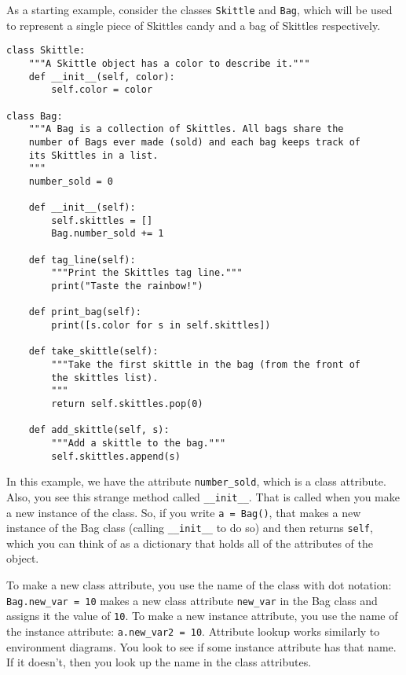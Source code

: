 As a starting example, consider the classes {\tt Skittle} and {\tt Bag}, which
will be used to represent a single piece of Skittles candy and a bag of Skittles
respectively.

\begin{lstlisting}
class Skittle:
    """A Skittle object has a color to describe it."""
    def __init__(self, color):
        self.color = color

class Bag:
    """A Bag is a collection of Skittles. All bags share the
    number of Bags ever made (sold) and each bag keeps track of
    its Skittles in a list.
    """
    number_sold = 0

    def __init__(self):
        self.skittles = []
        Bag.number_sold += 1

    def tag_line(self):
        """Print the Skittles tag line."""
        print("Taste the rainbow!")

    def print_bag(self):
        print([s.color for s in self.skittles])

    def take_skittle(self):
        """Take the first skittle in the bag (from the front of
        the skittles list).
        """
        return self.skittles.pop(0)

    def add_skittle(self, s):
        """Add a skittle to the bag."""
        self.skittles.append(s)
\end{lstlisting}

In this example, we have the attribute {\tt number\_sold}, which is a class
attribute. Also, you see this strange method called {\tt \_\_init\_\_}. That is
called when you make a new instance of the class. So, if you write {\tt a =
Bag()}, that makes a new instance of the Bag class (calling {\tt \_\_init\_\_}
to do so) and then returns {\tt self}, which you can think of as a dictionary
that holds all of the attributes of the object.

To make a new class attribute, you use the name of the class with dot notation:
{\tt Bag.new\_var = 10} makes a new class attribute {\tt new\_var} in the Bag
class and assigns it the value of {\tt 10}. To make a new instance attribute,
you use the name of the instance attribute: {\tt a.new\_var2 = 10}. Attribute
lookup works similarly to environment diagrams. You look to see if some instance
attribute has that name. If it doesn't, then you look up the name in the class
attributes.

